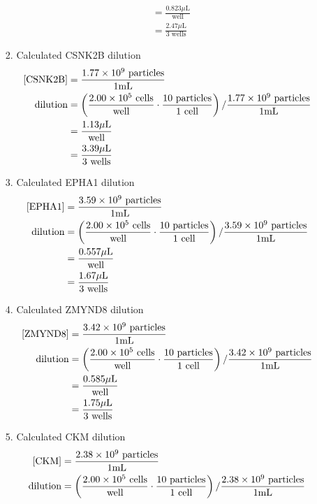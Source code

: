 \begin{enumerate}
\begin{enumerate}
\begin{enumerate}
\begin{align*}
							&= \frac{0.823\mu\text{L}}{\text{well}}\\
							&= \frac{2.47\mu\text{L}}{3\text{ wells}}
						\end{align*}
					\item Calculated CSNK2B dilution
							\begin{align*}
							\text{[CSNK2B]} &= \frac{1.77\times 10^{9}\text{ particles}}{1\text{mL}}\\
							\text{dilution}&= \left(\frac{2.00\times 10^{5}\text{ cells}}{\text{well}}\cdot \frac{10\text{ particles}}{1\text{ cell}}\right)/\frac{1.77\times 10^{9}\text{ particles}}{1\text{mL}}\\
							&= \frac{1.13\mu\text{L}}{\text{well}}\\
							&= \frac{3.39\mu\text{L}}{3\text{ wells}}
						\end{align*}
					\item Calculated EPHA1 dilution
							\begin{align*}
							\text{[EPHA1]} &= \frac{3.59\times 10^{9}\text{ particles}}{1\text{mL}}\\
							\text{dilution}&= \left(\frac{2.00\times 10^{5}\text{ cells}}{\text{well}}\cdot \frac{10\text{ particles}}{1\text{ cell}}\right)/\frac{3.59\times 10^{9}\text{ particles}}{1\text{mL}}\\
							&= \frac{0.557\mu\text{L}}{\text{well}}\\
							&= \frac{1.67\mu\text{L}}{3\text{ wells}}
						\end{align*}
					\item Calculated ZMYND8 dilution
							\begin{align*}
							\text{[ZMYND8]} &= \frac{3.42\times 10^{9}\text{ particles}}{1\text{mL}}\\
							\text{dilution}&= \left(\frac{2.00\times 10^{5}\text{ cells}}{\text{well}}\cdot \frac{10\text{ particles}}{1\text{ cell}}\right)/\frac{3.42\times 10^{9}\text{ particles}}{1\text{mL}}\\
							&= \frac{0.585\mu\text{L}}{\text{well}}\\
							&= \frac{1.75\mu\text{L}}{3\text{ wells}}
						\end{align*}
					\item Calculated CKM dilution
							\begin{align*}
							\text{[CKM]} &= \frac{2.38\e{9}\text{ particles}}{1\text{mL}}\\
							\text{dilution}&= \left(\frac{2.00\e{5}\text{ cells}}{\text{well}}\cdot \frac{10\text{ particles}}{1\text{ cell}}\right)/\frac{2.38\e{9}\text{ particles}}{1\text{mL}}\\

\end{align*}
\end{enumerate}
\end{enumerate}
\end{enumerate}
